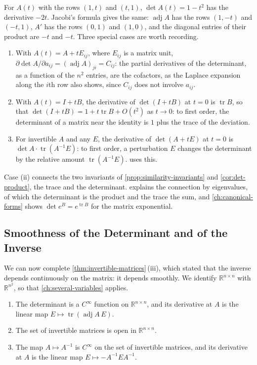 For $A(t)$ with the rows $(1,t)$ and $(t,1)$, $\det A(t)=1-t^2$ has the derivative $-2t$. Jacobi's formula gives the same: $\operatorname{adj}A$ has the rows $(1,-t)$ and $(-t,1)$, $A'$ has the rows $(0,1)$ and $(1,0)$, and the diagonal entries of their product are $-t$ and $-t$. Three special cases are worth recording.
\begin{enumerate}
\item With $A(t)=A+tE_{ij}$, where $E_{ij}$ is a matrix unit, $\partial\det A/\partial a_{ij}=(\operatorname{adj}A)_{ji}=C_{ij}$: the partial derivatives of the determinant, as a function of the $n^2$ entries, are the cofactors, as the Laplace expansion along the $i$th row also shows, since $C_{ij}$ does not involve $a_{ij}$.
\item With $A(t)=I+tB$, the derivative of $\det(I+tB)$ at $t=0$ is $\operatorname{tr}B$, so that $\det(I+tB)=1+t\operatorname{tr}B+O(t^2)$ as $t\to0$: to first order, the determinant of a matrix near the identity is $1$ plus the trace of the deviation.
\item For invertible $A$ and any $E$, the derivative of $\det(A+tE)$ at $t=0$ is $\det A\cdot\operatorname{tr}(A^{-1}E)$: to first order, a perturbation $E$ changes the determinant by the relative amount $\operatorname{tr}(A^{-1}E)$.  uses this.
\end{enumerate}
Case (ii) connects the two invariants of \cref{prop:similarity-invariants} and \cref{cor:det-product}, the trace and the determinant.  explains the connection by eigenvalues, of which the determinant is the product and the trace the sum, and \cref{ch:canonical-forms} shows $\det e^B=e^{\operatorname{tr}B}$ for the matrix exponential.

\subsection{Smoothness of the Determinant and of the Inverse}

We can now complete \cref{thm:invertible-matrices}\,(iii), which stated that the inverse depends continuously on the matrix: it depends smoothly. We identify $\mathbb R^{n\times n}$ with $\mathbb R^{n^2}$, so that \cref{ch:several-variables} applies.

\begin{theorem}
\label{thm:det-smooth}
\leavevmode
\begin{enumerate}
\item The determinant is a $C^\infty$ function on $\mathbb R^{n\times n}$, and its derivative at $A$ is the linear map $E\mapsto\operatorname{tr}(\operatorname{adj}A\,E)$.
\item The set of invertible matrices is open in $\mathbb R^{n\times n}$.
\item The map $A\mapsto A^{-1}$ is $C^\infty$ on the set of invertible matrices, and its derivative at $A$ is the linear map $E\mapsto-A^{-1}EA^{-1}$.
\end{enumerate}
\end{theorem}

